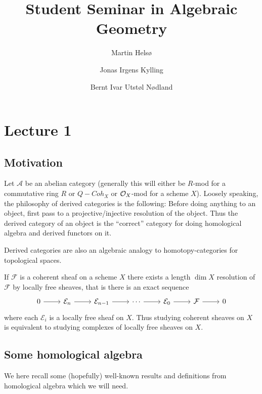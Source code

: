 \documentclass[a4paper, UKenglish]{report}
\title
{
    \bfseries\sffamily
    Student Seminar in Algebraic Geometry
}
\author
{
    Martin Hels\o
    \and
    Jonas Irgens Kylling
    \and
    Bernt Ivar Utst\o l N\o dland
}
\begin{document}
\begin{titlepage}
    \maketitle
\end{titlepage}

\chapter{Lecture 1}
\section{Motivation}

Let $\mathcal{A}$ be an abelian category (generally this will either be $R$-mod for a commutative ring $R$ or $Q-Coh_X$ or $\mathcal{O}_X$-mod for a scheme $X$). Loosely speaking, the philosophy of derived categories is the following: Before doing anything to an object, first pass to a projective/injective resolution of the object. Thus the derived category of an object is the ``correct'' category for doing homological algebra and derived functors on it.

Derived categories are also an algebraic analogy to homotopy-categories for topological spaces.

\begin{example}
    If $\mathcal{F}$ is a coherent sheaf on a scheme $X$ there exists a length $\dim X$ resolution of $\mathcal{F}$ by locally free sheaves, that is there is an exact sequence
    \[
    \begin{tikzcd}
        0 \arrow[r] & \mathcal{E}_n \arrow[r] & \mathcal{E}_{n-1} \arrow[r] & \cdots \arrow[r] & \mathcal{E}_0 \arrow[r] & \mathcal{F} \arrow[r] & 0 
    \end{tikzcd}
    \]
    where each $\mathcal{E}_i$ is a locally free sheaf on $X$. Thus studying coherent sheaves on $X$ is equivalent to studying complexes of locally free sheaves on $X$.
\end{example}

\section{Some homological algebra}

We here recall some (hopefully) well-known results and definitions from homo\-logical algebra which we will need.
\end{document}
